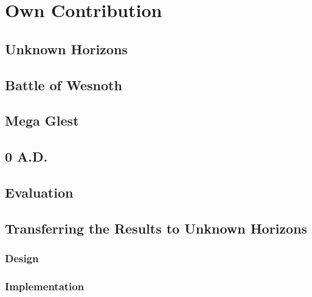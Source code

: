 \section{Own Contribution}

\subsection{Unknown Horizons}

\subsection{Battle of Wesnoth}

\subsection{Mega Glest}

\subsection{0 A.D.}

\subsection{Evaluation}

\subsection{Transferring the Results to Unknown Horizons}
\subsubsection{Design}
\subsubsection{Implementation}
